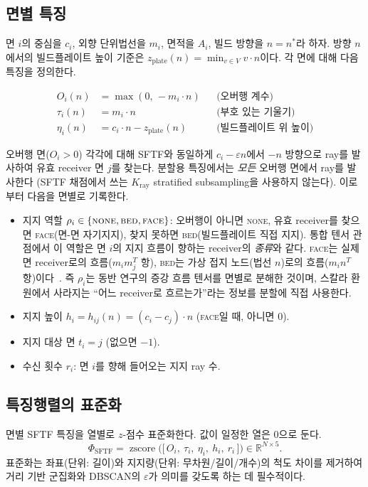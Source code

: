 \documentclass[11pt,a4paper]{article}
\begin{document}
\subsection{면별 특징}

면 $i$의 중심을 $c_i$, 외향 단위법선을 $m_i$, 면적을 $A_i$,
빌드 방향을 $n=n^\ast$라 하자.
방향 $n$에서의 빌드플레이트 높이 기준은 $z_{\mathrm{plate}}(n)=\min_{v\in V}v\cdot n$이다.
각 면에 대해 다음 특징을 정의한다.

\begin{align}
O_i(n) &= \max(0,\,-m_i\cdot n) && \text{(오버행 계수)}\\
\tau_i(n) &= m_i\cdot n && \text{(부호 있는 기울기)}\\
\eta_i(n) &= c_i\cdot n - z_{\mathrm{plate}}(n) && \text{(빌드플레이트 위 높이)}
\end{align}

오버행 면($O_i>0$) 각각에 대해 SFTF와 동일하게 $c_i-\varepsilon n$에서 $-n$ 방향으로
ray를 발사하여 유효 receiver 면 $j$를 찾는다.
분할용 특징에서는 \emph{모든} 오버행 면에서 ray를 발사한다
(SFTF 채점에서 쓰는 $K_{\mathrm{ray}}$ stratified subsampling을 사용하지 않는다).
이로부터 다음을 면별로 기록한다.

\begin{itemize}
\item 지지 역할 $\rho_i\in\{\textsc{none},\textsc{bed},\textsc{face}\}$:
오버행이 아니면 \textsc{none},
유효 receiver를 찾으면 \textsc{face}(면-면 자기지지),
찾지 못하면 \textsc{bed}(빌드플레이트 직접 지지).
통합 텐서 관점에서 이 역할은 면 $i$의 지지 흐름이 향하는 receiver의 \emph{종류}와 같다.
\textsc{face}는 실제 면 receiver로의 흐름($m_im_j^T$ 항),
\textsc{bed}는 가상 접지 노드(법선 $n$)로의 흐름($m_in^T$ 항)이다~\cite{sftf}.
즉 $\rho_i$는 동반 연구의 증강 흐름 텐서를 면별로 분해한 것이며,
스칼라 환원에서 사라지는 ``어느 receiver로 흐르는가''라는 정보를 분할에 직접 사용한다.
\item 지지 높이 $h_i = h_{ij}(n)=(c_i-c_j)\cdot n$ (\textsc{face}일 때, 아니면 $0$).
\item 지지 대상 면 $t_i = j$ (없으면 $-1$).
\item 수신 횟수 $r_i$: 면 $i$를 향해 들어오는 지지 ray 수.
\end{itemize}

\subsection{특징행렬의 표준화}

면별 SFTF 특징을 열별로 $z$-점수 표준화한다.
값이 일정한 열은 $0$으로 둔다.
\begin{equation}
\Phi_{\mathrm{SFTF}}
= \operatorname{zscore}\!\Big(\big[\,O_i,\ \tau_i,\ \eta_i,\ h_i,\ r_i\,\big]\Big)
\in\mathbb{R}^{N\times 5}.
\end{equation}
표준화는 좌표(단위: 길이)와 지지량(단위: 무차원/길이/개수)의 척도 차이를 제거하여
거리 기반 군집화와 DBSCAN의 $\varepsilon$가 의미를 갖도록 하는 데 필수적이다.
\end{document}

